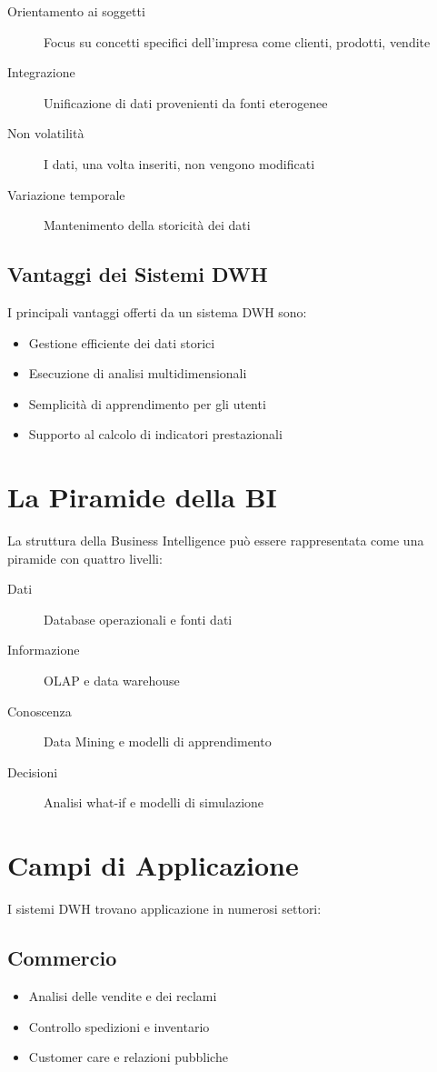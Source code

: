 \begin{description}
\item[Orientamento ai soggetti] Focus su concetti specifici dell'impresa come clienti, prodotti, vendite
\item[Integrazione] Unificazione di dati provenienti da fonti eterogenee
\item[Non volatilità] I dati, una volta inseriti, non vengono modificati
\item[Variazione temporale] Mantenimento della storicità dei dati
\end{description}

\section{Vantaggi dei Sistemi DWH}
I principali vantaggi offerti da un sistema DWH sono:
\begin{itemize}
\item Gestione efficiente dei dati storici
\item Esecuzione di analisi multidimensionali
\item Semplicità di apprendimento per gli utenti
\item Supporto al calcolo di indicatori prestazionali
\end{itemize}

\chapter{La Piramide della BI}
La struttura della Business Intelligence può essere rappresentata come una piramide con quattro livelli:

\begin{description}
\item[Dati] Database operazionali e fonti dati
\item[Informazione] OLAP e data warehouse
\item[Conoscenza] Data Mining e modelli di apprendimento
\item[Decisioni] Analisi what-if e modelli di simulazione
\end{description}

\chapter{Campi di Applicazione}

I sistemi DWH trovano applicazione in numerosi settori:

\section{Commercio}
\begin{itemize}
\item Analisi delle vendite e dei reclami
\item Controllo spedizioni e inventario
\item Customer care e relazioni pubbliche
\end{itemize}

